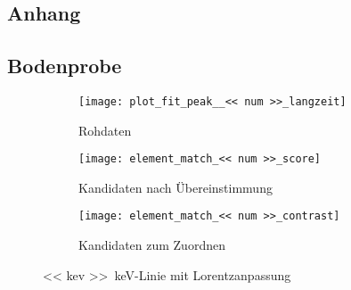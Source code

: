 \documentclass[11pt, ngerman, fleqn, DIV=15, headinclude, BCOR=2cm]{scrreprt}
\begin{document}

\begin{appendix}

\chapter{Anhang}
\section{Bodenprobe}

\begin{figure}
    \centering
    \begin{subfigure}{\linewidth}
        \texttt{[image: plot\_fit\_peak\_\_<< num >>\_langzeit]}
        \caption{Rohdaten}
    \end{subfigure}
    \begin{subfigure}{\linewidth}
        \texttt{[image: element\_match\_<< num >>\_score]}
        \caption{Kandidaten nach Übereinstimmung}
    \end{subfigure}
    \begin{subfigure}{\linewidth}
        \texttt{[image: element\_match\_<< num >>\_contrast]}
        \caption{Kandidaten zum Zuordnen}
    \end{subfigure}
    \caption{%
        \SI{<< kev >>}{\kilo\electronvolt}-Linie
        mit Lorentzanpassung
    }
    \label{fig:}
\end{figure}

\end{appendix}
\end{document}
